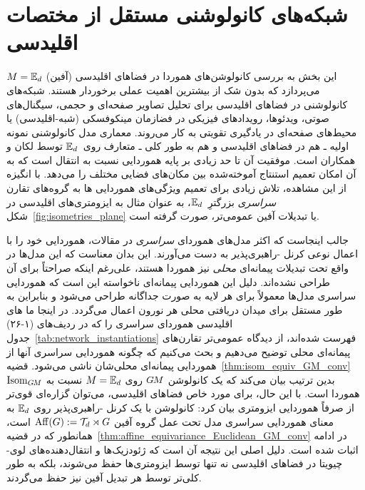 

\section{شبکه‌های کانولوشنی مستقل از مختصات اقلیدسی}
\label{sec:instantiations_euclidean}

این بخش به بررسی کانولوشن‌های هموردا در فضاهای اقلیدسی (آفین) $M = \mathbb{E}_d$ می‌پردازد که بدون شک از بیشترین اهمیت عملی برخوردار هستند.
شبکه‌های کانولوشنی در فضاهای اقلیدسی برای تحلیل تصاویر صفحه‌ای و حجمی، سیگنال‌های صوتی، ویدئوها، رویدادهای فیزیکی در فضازمان مینکوفسکی (شبه-اقلیدسی) یا محیط‌های صفحه‌ای در یادگیری تقویتی به کار می‌روند.
معماری مدل کانولوشنی نمونه اولیه ـ هم در فضاهای اقلیدسی و هم به طور کلی ـ \CNN متعارف روی~$\mathbb{E}_d$ توسط \cite{LeCun1990CNNs} لکان و همکاران است.
موفقیت آن تا حد زیادی بر پایه هموردایی نسبت به انتقال است که به آن امکان تعمیم استنتاج آموخته‌شده بین مکان‌های فضایی مختلف را می‌دهد.
با انگیزه از این مشاهده، تلاش زیادی برای تعمیم ویژگی‌های هموردایی \CNN ها به گروه‌های تقارن \emph{سراسری} بزرگترِ~$\mathbb{E}_d$، به عنوان مثال به ایزومتری‌های اقلیدسی در شکل~\ref{fig:isometries_plane} یا تبدیلات آفین عمومی‌تر، صورت گرفته است.


جالب اینجاست که اکثر مدل‌های هموردای \emph{سراسری} در مقالات، هموردایی خود را با اعمال نوعی کرنل -راهبری‌پذیر به دست می‌آورند.
این بدان معناست که این مدل‌ها در واقع تحت تبدیلات پیمانه‌ای \emph{محلی} نیز هموردا هستند، علی‌رغم اینکه صراحتاً برای آن طراحی نشده‌اند.
دلیل این هموردایی پیمانه‌ای ناخواسته این است که هموردایی سراسری مدل‌ها معمولاً برای هر لایه به صورت جداگانه طراحی می‌شود و بنابراین به طور مستقل برای میدان دریافتی محلی هر نورون اعمال می‌گردد.
در اینجا ما \CNN های اقلیدسی هموردای سراسری را که در ردیف‌های (۱-۲۶) جدول~\ref{tab:network_instantiations} فهرست شده‌اند، از دیدگاه عمومی‌تر تقارن‌های پیمانه‌ای محلی توضیح می‌دهیم و بحث می‌کنیم که چگونه هموردایی سراسری آنها از هموردایی پیمانه‌ای محلی‌شان ناشی می‌شود.
قضیه~\ref{thm:isom_equiv_GM_conv} بدین ترتیب بیان می‌کند که یک کانولوشن $G\mkern-1.4muM$ روی $M = \mathbb{E}_d$ نسبت به $\operatorname{Isom}_{G\mkern-1.4muM}$ هموردا است.
با این حال، برای مورد خاص فضاهای اقلیدسی، می‌توان گزاره‌ای قوی‌تر از صرفاً هموردایی ایزومتری بیان کرد:
کانولوشن با یک کرنل -راهبری‌پذیر روی $\mathbb{E}_d$ به معنای هموردایی سراسری مدل تحت عمل گروه آفین $\operatorname{Aff}(G) := \mathcal{T}_d \rtimes G$ است، همانطور که در قضیه~\ref{thm:affine_equivariance_Euclidean_GM_conv} در ادامه اثبات شده است.
دلیل اصلی این نتیجه آن است که ژئودزیک‌ها و انتقال‌دهنده‌های لوی-چیویتا در فضاهای اقلیدسی نه تنها توسط ایزومتری‌ها حفظ می‌شوند، بلکه به طور کلی‌تر توسط هر تبدیل آفین نیز حفظ می‌گردند.

